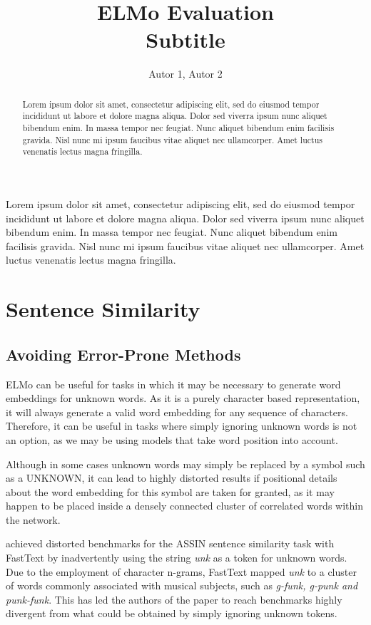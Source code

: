 \documentclass[12pt]{article}
\title{ELMo Evaluation\\ Subtitle}
\author{Autor 1\inst{1}, Autor 2\inst{2} }
\begin{document}
 

\maketitle

\begin{abstract}
  Lorem ipsum dolor sit amet, consectetur adipiscing elit, sed do eiusmod tempor incididunt ut labore et dolore magna aliqua. Dolor sed viverra ipsum nunc aliquet bibendum enim. In massa tempor nec feugiat. Nunc aliquet bibendum enim facilisis gravida. Nisl nunc mi ipsum faucibus vitae aliquet nec ullamcorper. Amet luctus venenatis lectus magna fringilla. 
\end{abstract}
     
\begin{resumo} 
  Lorem ipsum dolor sit amet, consectetur adipiscing elit, sed do eiusmod tempor incididunt ut labore et dolore magna aliqua. Dolor sed viverra ipsum nunc aliquet bibendum enim. In massa tempor nec feugiat. Nunc aliquet bibendum enim facilisis gravida. Nisl nunc mi ipsum faucibus vitae aliquet nec ullamcorper. Amet luctus venenatis lectus magna fringilla. 
\end{resumo}

\section{Sentence Similarity}  

\subsection{Avoiding Error-Prone Methods}

ELMo can be useful for tasks in which it may be necessary to generate word embeddings for unknown words. As it is a purely character based representation, it will always generate a valid word embedding for any sequence of characters. Therefore, it can be useful in tasks where simply ignoring unknown words is not an option, as we may be using models that take word position into account.

Although in some cases unknown words may simply be replaced by a symbol such as a UNKNOWN, it can lead to highly distorted results if positional details about the word embedding for this symbol are taken for granted, as it may happen to be placed inside a densely connected cluster of correlated words within the network. 

\cite{hartmann2017portuguese} achieved distorted benchmarks for the ASSIN sentence similarity task with FastText by inadvertently using the string \textit{unk} as a token for unknown words. Due to the employment of character n-grams, FastText mapped \textit{unk} to a cluster of words commonly associated with musical subjects, such as \textit{g-funk, g-punk and punk-funk}. This has led the authors of the paper to reach benchmarks highly divergent from what could be obtained by simply ignoring unknown tokens.
\end{document}

